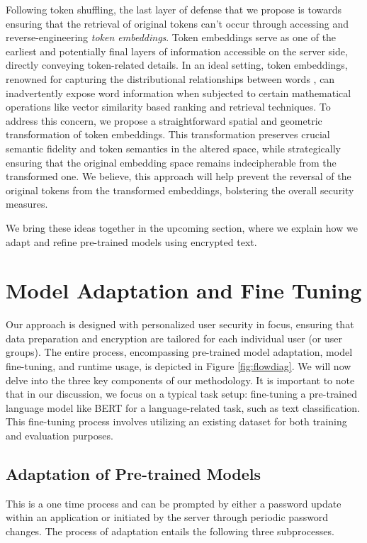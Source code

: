 \documentclass[letterpaper]{article} %
\begin{document}
Following token shuffling, the last layer of defense that we propose is towards ensuring that the retrieval of original tokens can't occur through accessing and reverse-engineering \emph{token embeddings}. Token embeddings serve as one of the earliest and potentially final layers of information accessible on the server side, directly conveying token-related details. In an ideal setting, token embeddings, renowned for capturing the distributional relationships between words \cite{levy-etal-2015-improving,mikolov2013efficient}, can inadvertently expose word information when subjected to certain mathematical operations like vector similarity based ranking and retrieval techniques. To address this concern, we propose a straightforward spatial and geometric transformation of token embeddings. This transformation preserves  crucial semantic fidelity and token semantics in the altered space, while strategically ensuring that the original embedding space remains indecipherable from the transformed one. We believe, this approach will help prevent the reversal of the original tokens from the transformed embeddings, bolstering the overall security measures.

We bring these ideas together in the upcoming section, where we explain how we adapt and refine pre-trained models using encrypted text.

\section{Model Adaptation and Fine Tuning}
\label{sec:lmadaptation}
Our approach is designed with personalized user security in focus, ensuring that data preparation and encryption are tailored for each individual user (or user groups). The entire process, encompassing pre-trained model adaptation, model fine-tuning, and runtime usage, is depicted in Figure \ref{fig:flowdiag}. We will now delve into the three key components of our methodology. It is important to note that in our discussion, we focus on a typical task setup: fine-tuning a pre-trained language model like BERT for a language-related task, such as text classification. This fine-tuning process involves utilizing an existing dataset for both training and evaluation purposes.
\subsection{Adaptation of Pre-trained Models}
\label{sec:adaptdetails}
This is a one time process and can be prompted by either a password update within an application or initiated by the server through periodic password changes. The process of adaptation entails the following three subprocesses.
\end{document}
